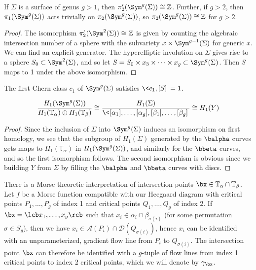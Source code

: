 \begin{lem}
If $\Sigma$ is a surface of genus $g>1$, then $\pi_2'(\Sym^g(\Sigma)) \cong \mathbb Z$. Further, if $g>2$, then $\pi_1(\Sym^g(\Sigma))$ acts trivially on $\pi_2(\Sym^g(\Sigma))$, so $\pi_2(\Sym^g(\Sigma)) \cong \mathbb Z$ for $g>2$.
\end{lem}
\begin{proof}
The isomorphism $\pi_2'(\Sym^2(\Sigma)) \cong \mathbb Z$ is given by counting the algebraic intersection number of a sphere with the subvariety $x \times \Sym^{g-1}(\Sigma)$ for generic $x$. We can find an explicit generator. The hyperelliptic involution on $\Sigma$ gives rise to a sphere $S_0 \subset \Sym^2(\Sigma)$, and so let $S = S_0 \times x_3 \times \cdots \times x_g \subset \Sym^g(\Sigma)$. Then $S$ maps to 1 under the above isomorphism.
\end{proof}

\begin{lem}
The first Chern class $c_1$ of $\Sym^g(\Sigma)$ satisfies $\< c_1,[S] \>=1$.
\end{lem}

\begin{lem}
\label{first homology of Y}
\[ \frac{H_1(\Sym^g(\Sigma))}{H_1(\mathbb T_\alpha) \oplus H_1(\mathbb T_\beta)} \cong \frac{H_1(\Sigma)}{\< [\alpha_1],\ldots,[\alpha_g],[\beta_1],\ldots,[\beta_g] \>} \cong H_1(Y) \]
\end{lem}
\begin{proof}
Since the inclusion of $\Sigma$ into $\Sym^g(\Sigma)$ induces an isomorphism on first homology, we see that the subgroup of $H_1(\Sigma)$ generated by the $\balpha$ curves gets maps to $H_1(\mathbb T_\alpha)$ in $H_1(\Sym^g(\Sigma))$, and similarly for the $\bbeta$ curves, and so the first isomorphism follows. The second isomorphism is obvious since we building $Y$ from $\Sigma$ by filling the $\balpha$ and $\bbeta$ curves with discs. 
\end{proof}

There is a Morse theoretic interpretation of intersection points $\bx \in \mathbb T_\alpha \cap \mathbb T_\beta$. Let $f$ be a Morse function compatible with our Heegaard diagram with critical points $P_1,\ldots,P_g$ of index 1 and critical points $Q_1,\ldots,Q_g$ of index 2. If $\bx = \lcb x_1,\ldots,x_g \rcb$ such that $x_i \in \alpha_i \cap \beta_{\sigma(i)}$ (for some permutation $\sigma \in S_g$), then we have $x_i \in \mathcal A(P_i) \cap \mathcal D(Q_{\sigma(i)})$, hence $x_i$ can be identified with an unparameterized, gradient flow line from $P_i$ to $Q_{\sigma(i)}$. The intersection point $\bx$ can therefore be identified with a $g$-tuple of flow lines from index 1 critical points to index 2 critical points, which we will denote by $\gamma_\bx$.


